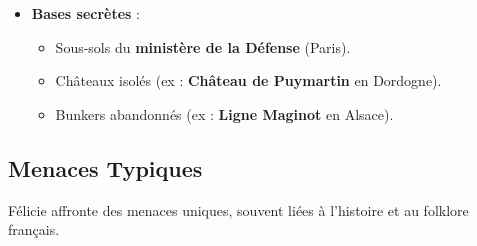 \documentclass[10pt,a5paper,twoside]{book}
\begin{document}
\begin{itemize}
\begin{itemize}
		\item Collaboration avec des sociétés secrètes (franc-maçonnerie, Rosicruciens).
		\item Contacts dans les \textbf{archives nationales} et les \textbf{musées} (ex : Louvre, Bibliothèque nationale).
		\end{itemize}
	\item \textbf{Bases secrètes} :
	\begin{itemize}
		\item Sous-sols du \textbf{ministère de la Défense} (Paris).
		\item Châteaux isolés (ex : \textbf{Château de Puymartin} en Dordogne).
		\item Bunkers abandonnés (ex : \textbf{Ligne Maginot} en Alsace).
	\end{itemize}
\end{itemize}

\newpage

\subsection{Menaces Typiques}
Félicie affronte des menaces uniques, souvent liées à l'histoire et au folklore français.
\end{document}

